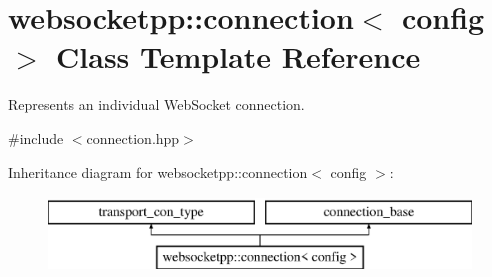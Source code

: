 \hypertarget{classwebsocketpp_1_1connection}{}\section{websocketpp\+:\+:connection$<$ config $>$ Class Template Reference}
\label{classwebsocketpp_1_1connection}


Represents an individual Web\+Socket connection.  




{\ttfamily \#include $<$connection.\+hpp$>$}

Inheritance diagram for websocketpp\+:\+:connection$<$ config $>$\+:\begin{figure}[H]
\begin{center}
\leavevmode
\includegraphics[height=2.000000cm]{classwebsocketpp_1_1connection}
\end{center}
\end{figure}
